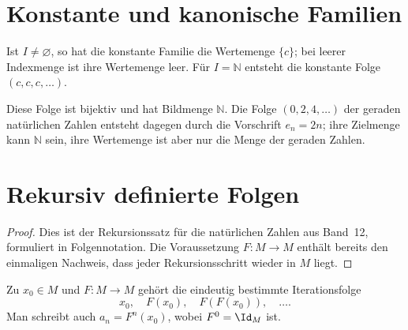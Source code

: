 \documentclass[main.tex]{subfiles}
\begin{document}
\section{Konstante und kanonische Familien}


Ist \(I\neq\varnothing\), so hat die konstante Familie die Wertemenge
\(\{c\}\); bei leerer Indexmenge ist ihre Wertemenge leer. Für
\(I=\mathbb N\) entsteht die konstante Folge \((c,c,c,\ldots)\).


Diese Folge ist bijektiv und hat Bildmenge \(\mathbb N\). Die Folge
\((0,2,4,\ldots)\) der geraden natürlichen Zahlen entsteht dagegen durch
die Vorschrift \(e_n=2n\); ihre Zielmenge kann \(\mathbb N\) sein, ihre
Wertemenge ist aber nur die Menge der geraden Zahlen.

\section{Rekursiv definierte Folgen}

\begin{proof}
Dies ist der Rekursionssatz für die natürlichen Zahlen aus Band~12,
formuliert in Folgennotation. Die Voraussetzung \(F\colon M\to M\) enthält
bereits den einmaligen Nachweis, dass jeder Rekursionsschritt wieder in
\(M\) liegt.
\end{proof}

\begin{example}[Iteration]
Zu \(x_0\in M\) und \(F\colon M\to M\) gehört die eindeutig bestimmte
Iterationsfolge
\[
  x_0,\quad F(x_0),\quad F(F(x_0)),\quad\ldots.
\]
Man schreibt auch \(a_n=F^n(x_0)\), wobei \(F^0=\Id_M\) ist.
\end{example}
\end{document}
